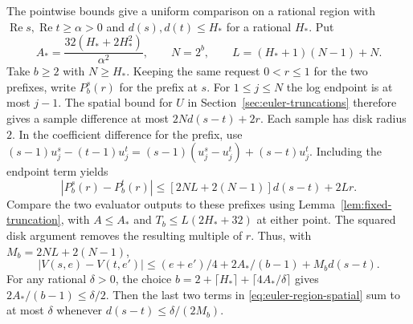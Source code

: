 \documentclass[11pt]{amsart}
\theoremstyle{definition}
\theoremstyle{remark}
\numberwithin{equation}{section}
\newcommand{\re}{\operatorname{Re}}
\begin{document}
The pointwise bounds give a uniform comparison on a rational
region with $\re s,\re t\ge\alpha>0$ and
$d(s),d(t)\le H_*$ for a rational $H_*$. Put
\[
 A_*=\frac{32(H_*+2H_*^2)}{\alpha^2},\qquad
 N=2^b,\qquad L=(H_*+1)(N-1)+N.
\]
Take $b\ge2$ with $N\ge H_*$.
Keeping the same request $0<r\le1$ for the two prefixes,
write $P_b^s(r)$ for the prefix at $s$. For $1\le j\le N$
the log endpoint is at most $j-1$. The spatial bound for
$U$ in Section~\ref{sec:euler-truncations} therefore gives
a sample difference at most $2N d(s-t)+2r$. Each sample
has disk radius $2$. In the coefficient difference for the
prefix, use
$(s-1)u_j^s-(t-1)u_j^t=(s-1)(u_j^s-u_j^t)+(s-t)u_j^t$.
Including the endpoint term yields
\[
 |P_b^s(r)-P_b^t(r)| \le [2NL+2(N-1)]d(s-t)+2Lr .
\]
Compare the two evaluator outputs to these prefixes using
Lemma~\ref{lem:fixed-truncation}, with $A\le A_*$ and
$T_b\le L(2H_*+32)$ at either point. The squared disk
argument removes the resulting multiple of $r$. Thus,
with $M_b=2NL+2(N-1)$,
\begin{equation}\label{eq:euler-region-spatial}
 |V(s,e)-V(t,e')|
 \le (e+e')/4 + 2A_* /(b-1)+M_b d(s-t).
\end{equation}
For any rational $\delta>0$, the choice
$b=2+\lceil H_*\rceil+\lceil 4A_*/\delta\rceil$
gives $2A_* /(b-1)\le\delta/2$. Then the last two terms
in \eqref{eq:euler-region-spatial} sum to at most $\delta$
whenever $d(s-t)\le\delta/(2M_b)$.
\end{document}
